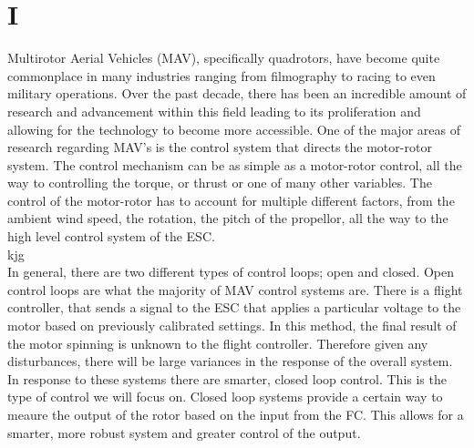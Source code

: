 \documentclass{article}
\begin{document}
\section{I}

Multirotor Aerial Vehicles (MAV), specifically quadrotors, have become quite commonplace in many industries ranging from filmography to racing to even military operations. Over the past decade, there has been an incredible amount of research and advancement within this field leading to its proliferation and allowing for the technology to become more accessible. One of the major areas of research regarding MAV's is the control system that directs the motor-rotor system. The control mechanism can be as simple as a motor-rotor control, all the way to controlling the torque, or thrust or one of many other variables. The control of the motor-rotor has to account for multiple different factors, from the ambient wind speed, the rotation, the pitch of the propellor, all the way to the high level control system of the ESC. \\
kjg
\\

In general, there are two different types of control loops; open and closed. Open control loops are what the majority of MAV control systems are. There is a flight controller, that sends a signal to the ESC that applies a particular voltage to the motor based on previously calibrated settings. In this method, the final result of the motor spinning is unknown to the flight controller. Therefore given any disturbances, there will be large variances in the response of the overall system. In response to these systems there are smarter, closed loop control. This is the type of control we will focus on. Closed loop systems provide a certain way to meaure the output of the rotor based on the input from the FC. This allows for a smarter, more robust system and greater control of the output. \\
\end{document}
